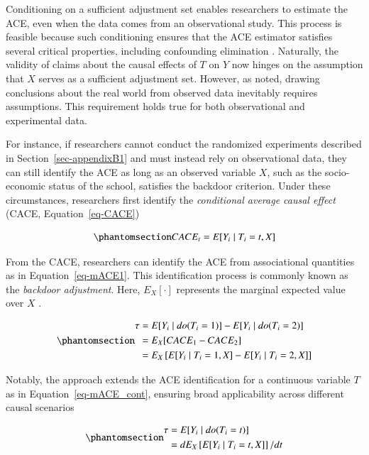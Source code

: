 \documentclass[
  authoryear,
  review,
  1p]{elsarticle}
\begin{document}
Conditioning on a sufficient adjustment set enables researchers to
estimate the ACE, even when the data comes from an observational study.
This process is feasible because such conditioning ensures that the ACE
estimator satisfies several critical properties, including confounding
elimination \citep{Morgan_et_al_2014}. Naturally, the validity of claims
about the causal effects of \(T\) on \(Y\) now hinges on the assumption
that \(X\) serves as a sufficient adjustment set. However, as
\citet[pp.~150]{Kohler_et_al_2019} noted, drawing conclusions about the
real world from observed data inevitably requires assumptions. This
requirement holds true for both observational and experimental data.

For instance, if researchers cannot conduct the randomized experiments
described in Section~\ref{sec-appendixB1} and must instead rely on
observational data, they can still identify the ACE as long as an
observed variable \(X\), such as the socio-economic status of the
school, satisfies the backdoor criterion. Under these circumstances,
researchers first identify the \emph{conditional average causal effect}
(CACE, Equation~\ref{eq-CACE})

\begin{equation}\phantomsection\label{eq-CACE}{
CACE_{t} = E[Y_{i} \mid T_{i}=t, X]
}\end{equation}

From the CACE, researchers can identify the ACE from associational
quantities as in Equation~\ref{eq-mACE1}. This identification process is
commonly known as the \emph{backdoor adjustment}. Here, \(E_{X}[\cdot]\)
represents the marginal expected value over \(X\)
\citep{Morgan_et_al_2014}.

\begin{equation}\phantomsection\label{eq-mACE1}{
\begin{aligned}
  \tau & = E[Y_{i} \mid do(T_{i}=1)]- E[Y_{i} \mid do(T_{i}=2)] \\
  & = E_{X}[CACE_{1} - CACE_{2}] \\
  & = E_{X}\left[ E[Y_{i} \mid T_{i}=1, X] - E[Y_{i} \mid T_{i}=2, X] \right]
\end{aligned}
}\end{equation}

Notably, the approach extends the ACE identification for a continuous
variable \(T\) as in Equation~\ref{eq-mACE_cont}, ensuring broad
applicability across different causal scenarios
\citep[pp.~45]{Neal_2020}

\begin{equation}\phantomsection\label{eq-mACE_cont}{
\begin{aligned}
  \tau &= E[Y_{i} \mid do(T_{i}=t)] \\
  & = d E_{X}\left[ E[Y_{i} \mid T_{i}=t, X]\right]/ dt
  \end{aligned}
}\end{equation}
\end{document}

